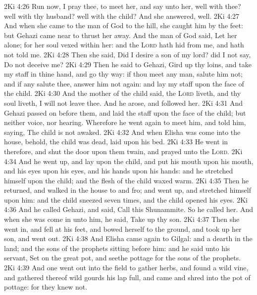 \vs 2Ki 4:26 Run now, I pray thee, to meet her, and say unto her,  well with thee?  well with thy husband?  well with the child? And she answered,  well.
\vs 2Ki 4:27 And when she came to the man of God to the hill, she caught him by the feet: but Gehazi came near to thrust her away. And the man of God said, Let her alone; for her soul  vexed within her: and the \textsc{Lord} hath hid  from me, and hath not told me.
\vs 2Ki 4:28 Then she said, Did I desire a son of my lord? did I not say, Do not deceive me?
\vs 2Ki 4:29 Then he said to Gehazi, Gird up thy loins, and take my staff in thine hand, and go thy way: if thou meet any man, salute him not; and if any salute thee, answer him not again: and lay my staff upon the face of the child.
\vs 2Ki 4:30 And the mother of the child said,  the \textsc{Lord} liveth, and  thy soul liveth, I will not leave thee. And he arose, and followed her.
\vs 2Ki 4:31 And Gehazi passed on before them, and laid the staff upon the face of the child; but  neither voice, nor hearing. Wherefore he went again to meet him, and told him, saying, The child is not awaked.
\vs 2Ki 4:32 And when Elisha was come into the house, behold, the child was dead,  laid upon his bed.
\vs 2Ki 4:33 He went in therefore, and shut the door upon them twain, and prayed unto the \textsc{Lord}.
\vs 2Ki 4:34 And he went up, and lay upon the child, and put his mouth upon his mouth, and his eyes upon his eyes, and his hands upon his hands: and he stretched himself upon the child; and the flesh of the child waxed warm.
\vs 2Ki 4:35 Then he returned, and walked in the house to and fro; and went up, and stretched himself upon him: and the child sneezed seven times, and the child opened his eyes.
\vs 2Ki 4:36 And he called Gehazi, and said, Call this Shunammite. So he called her. And when she was come in unto him, he said, Take up thy son.
\vs 2Ki 4:37 Then she went in, and fell at his feet, and bowed herself to the ground, and took up her son, and went out.
\vs 2Ki 4:38 And Elisha came again to Gilgal: and  a dearth in the land; and the sons of the prophets  sitting before him: and he said unto his servant, Set on the great pot, and seethe pottage for the sons of the prophets.
\vs 2Ki 4:39 And one went out into the field to gather herbs, and found a wild vine, and gathered thereof wild gourds his lap full, and came and shred  into the pot of pottage: for they knew  not.
